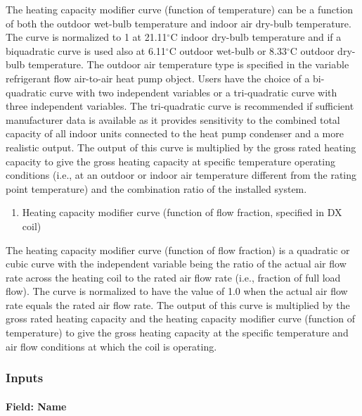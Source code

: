 The heating capacity modifier curve (function of temperature) can be a function of both the outdoor wet-bulb temperature and indoor air dry-bulb temperature. The curve is normalized to 1 at 21.11$^\circ$C indoor dry-bulb temperature and if a biquadratic curve is used also at 6.11$^\circ$C outdoor wet-bulb or 8.33$^\circ$C outdoor dry-bulb temperature. The outdoor air temperature type is specified in the variable refrigerant flow air-to-air heat pump object. Users have the choice of a bi-quadratic curve with two independent variables or a tri-quadratic curve with three independent variables. The tri-quadratic curve is recommended if sufficient manufacturer data is available as it provides sensitivity to the combined total capacity of all indoor units connected to the heat pump condenser and a more realistic output. The output of this curve is multiplied by the gross rated heating capacity to give the gross heating capacity at specific temperature operating conditions (i.e., at an outdoor or indoor air temperature different from the rating point temperature) and the combination ratio of the installed system.

\begin{enumerate}
\def\labelenumi{\arabic{enumi})}
\setcounter{enumi}{1}
\tightlist
\item
  Heating capacity modifier curve (function of flow fraction, specified in DX coil)
\end{enumerate}

The heating capacity modifier curve (function of flow fraction) is a quadratic or cubic curve with the independent variable being the ratio of the actual air flow rate across the heating coil to the rated air flow rate (i.e., fraction of full load flow). The curve is normalized to have the value of 1.0 when the actual air flow rate equals the rated air flow rate. The output of this curve is multiplied by the gross rated heating capacity and the heating capacity modifier curve (function of temperature) to give the gross heating capacity at the specific temperature and air flow conditions at which the coil is operating.

\subsubsection{Inputs}\label{inputs-7-010}

\paragraph{Field: Name}\label{field-name-6-007}


